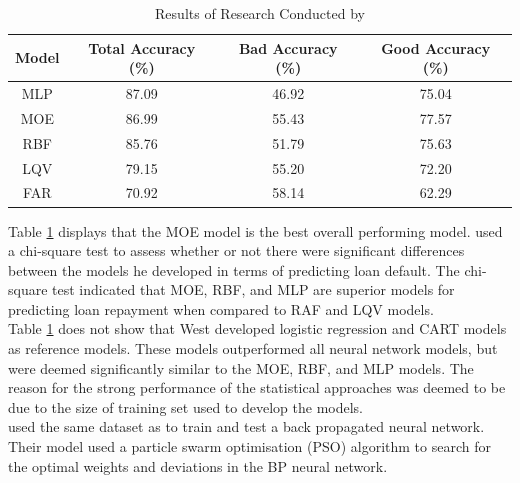 \vspace{15pt}

\begin{table}[H]
\begin{center}
\begin{tabular}{|c|c|c|c|} 
\hline
\multicolumn{1}{|c}{Model}  &\multicolumn{1}{|c|}{Total Accuracy (\%)}  &\multicolumn{1}{|c|}{Bad Accuracy (\%)} & \multicolumn{1}{c|}{Good Accuracy (\%)}\\
\hline
MLP & 87.09 &  46.92 & 75.04 \\
\hline
MOE & 86.99 &  55.43 & 77.57 \\
\hline
RBF & 85.76 &  51.79 & 75.63 \\
\hline
LQV & 79.15 &  55.20 & 72.20 \\
\hline
FAR & 70.92 &  58.14 & 62.29 \\
\hline
\end{tabular}
\end{center}
\caption{Results of Research Conducted by \textcite{NNWest}}
\label{table:NN}
\end{table}

\vspace{15pt}

Table \ref{table:NN} displays that the MOE model is the best overall performing model. \textcite{NNWest} used a chi-square test to assess whether or not there were significant differences between the models he developed in terms of predicting loan default. The chi-square test indicated that MOE, RBF, and MLP are superior models for predicting loan repayment when compared to RAF and LQV models. \\

Table \ref{table:NN} does not show that West developed logistic regression and CART models as reference models. These models outperformed all neural network models, but were deemed significantly similar to the MOE, RBF, and MLP models. The reason for the strong performance of the statistical approaches was deemed to be due to the size of training set used to develop the models.  \\

\textcite{NNShen} used the same dataset as \textcite{NNWest} to train and test a back propagated neural network. Their model used a particle swarm optimisation (PSO) algorithm to search for the optimal weights and deviations in the BP neural network. \\

